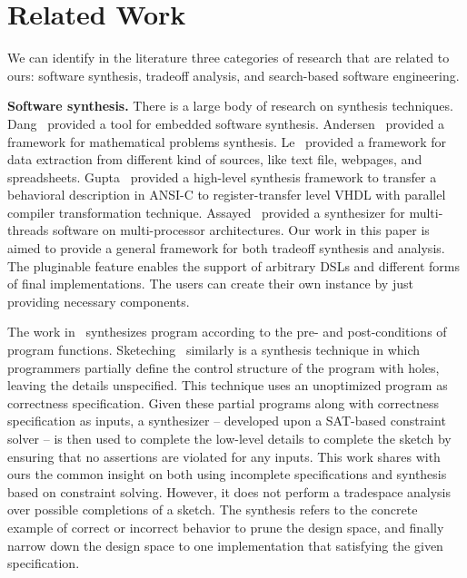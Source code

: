 \documentclass{sig-alternate}
\begin{document}
\section{Related Work}
\label{relatedwork}
We can identify in the literature three categories of research that are related to ours: 
software synthesis, tradeoff analysis, and search-based software engineering. 

\textbf{Software synthesis.} There is a large body of research on synthesis techniques. Dang~\cite{tool_for_embedded_system} provided a tool for embedded software synthesis. Andersen~\cite{tool_for_education_progressions} provided a framework for mathematical problems synthesis. Le~\cite{tool_for_data_extraction} provided a framework for data extraction from different kind of sources, like text file, webpages, and spreadsheets. Gupta~\cite{tool_for_parallel_compiler_transformations} provided a high-level synthesis framework to transfer a behavioral description in ANSI-C to register-transfer level VHDL with parallel compiler transformation technique. Assayed~\cite{tool_for_sw_synthesis} provided a synthesizer for multi-threads software on multi-processor architectures. Our work in this paper is aimed to provide a general framework for both tradeoff synthesis and analysis. The pluginable feature enables the support of arbitrary DSLs and different forms of final implementations. The users can create their own instance by just providing necessary components.

The work in~\cite{verify_to_synthesis} synthesizes program according to the pre- and post-conditions of program functions. %
Sketeching~\cite{program_sketching} similarly is a synthesis technique in which programmers partially define the control structure of the program with holes, leaving the details unspecified. This technique uses an unoptimized program as correctness specification. Given these partial programs along with correctness specification as inputs, a synthesizer -- developed upon a SAT-based constraint solver -- is then used to complete the low-level details to complete the sketch by ensuring that no assertions are violated for any inputs. This work shares with ours the common insight on both using incomplete specifications and synthesis based on constraint solving. However, it does not perform a tradespace analysis over possible completions of a sketch. The synthesis refers to the concrete example of correct or incorrect behavior to prune the design space, and finally narrow down the design space to one implementation that satisfying the given specification.
\end{document}

